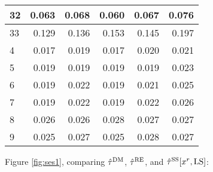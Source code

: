 \documentclass[12pt]{article}\usepackage[]{graphicx}\usepackage[]{xcolor}
\begin{document}
\begin{table}
\begin{tabular}[t]{l|r|r|r|r|r}
\hline
32 & 0.063 & 0.068 & 0.060 & 0.067 & 0.076\\
\hline
33 & 0.129 & 0.136 & 0.153 & 0.145 & 0.197\\
\hline
4 & 0.017 & 0.019 & 0.017 & 0.020 & 0.021\\
\hline
5 & 0.019 & 0.019 & 0.019 & 0.019 & 0.023\\
\hline
6 & 0.019 & 0.022 & 0.019 & 0.021 & 0.025\\
\hline
7 & 0.019 & 0.022 & 0.019 & 0.022 & 0.026\\
\hline
8 & 0.026 & 0.026 & 0.028 & 0.027 & 0.027\\
\hline
9 & 0.025 & 0.027 & 0.025 & 0.028 & 0.027\\
\hline
\end{tabular}
\end{table}



Figure \ref{fig:ses1}, comparing
$\hat{\tau}^{\mathrm{DM}}$,
$\hat{\tau}^{\mathrm{RE}}$, and $\hat{\tau}^{\mathrm{SS}}[x^r, \mathrm{LS}]$:
\end{document}

